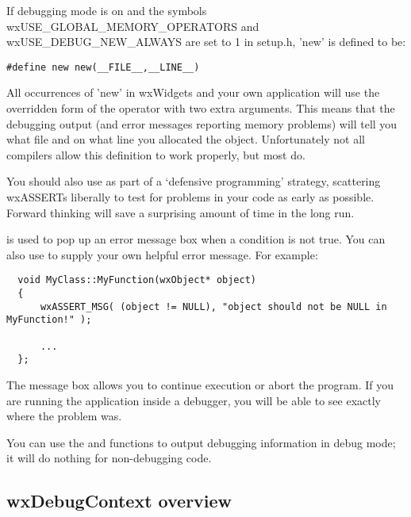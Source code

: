 If debugging mode is on and the symbols wxUSE\_GLOBAL\_MEMORY\_OPERATORS and
wxUSE\_DEBUG\_NEW\_ALWAYS are set to 1 in setup.h, 'new' is defined to be:

{\small
\begin{verbatim}
#define new new(__FILE__,__LINE__)
\end{verbatim}
}%

All occurrences of 'new' in wxWidgets and your own application will use
the overridden form of the operator with two extra arguments. This means that the debugging
output (and error messages reporting memory problems) will tell you what
file and on what line you allocated the object. Unfortunately not all
compilers allow this definition to work properly, but most do.


You should also use  as part of a `defensive programming' strategy,
scattering wxASSERTs liberally to test for problems in your code as early as possible. Forward thinking
will save a surprising amount of time in the long run.

 is used to pop up an error message box when a condition
is not true. You can also use  to supply your
own helpful error message. For example:

{\small
\begin{verbatim}
  void MyClass::MyFunction(wxObject* object)
  {
      wxASSERT_MSG( (object != NULL), "object should not be NULL in MyFunction!" );

      ...
  };
\end{verbatim}
}

The message box allows you to continue execution or abort the program. If you are running
the application inside a debugger, you will be able to see exactly where the problem was.


You can use the  and  functions to output debugging information in debug mode;
it will do nothing for non-debugging code.

\subsection{wxDebugContext overview}\label{wxdebugcontextoverview}


